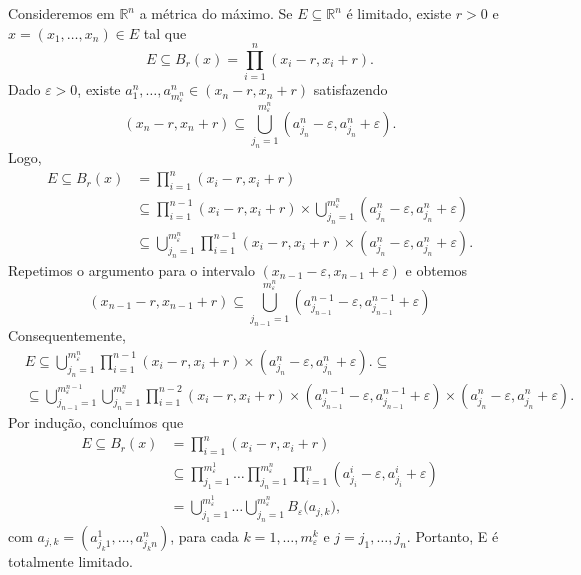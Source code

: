 \documentclass[MetricSpaces/metric_notes.tex]{subfiles}
\begin{document}
\begin{proof*}
	Consideremos em \(\mathbb{R}^{n}\) a métrica do máximo. Se \(E\subseteq{\mathbb{R}^{n}}\) é limitado, existe \(r > 0\) e \(x = (x_{1}, \dotsc, x_{n})\in E\) tal que
	\[
		E\subseteq{B_{r}(x)} = \prod\limits_{i=1}^{n}(x_{i}-r, x_{i}+r).
	\]
	Dado \(\varepsilon >0\), existe \(a_{1}^{n}, \dotsc, a_{m_{\varepsilon }^{n}}^{n}\in(x_{n}-r, x_{n}+r)\) satisfazendo
	\[
		(x_{n}-r,x_{n}+r) \subseteq{\bigcup_{j_{n}=1}^{m_{\varepsilon }^{n}}{(a_{j_{n}}^{n}-\varepsilon , a_{j_{n}}^{n}+\varepsilon )}}.
	\]
	Logo,
	\begin{align*}
		E \subseteq{B_{r}(x)} & =\prod\limits_{i=1}^{n}(x_{i}-r, x_{i}+r)                                                                                                                      \\
		                      & \subseteq{}\prod\limits_{i=1}^{n-1}(x_{i}-r, x_{i}+r)\times \bigcup_{j_{n}=1}^{m_{\varepsilon }^{n}}{(a_{j_{n}}^{n}-\varepsilon , a_{j_{n}}^{n}+\varepsilon )} \\
		                      & \subseteq{\bigcup_{j_{n}=1}^{m_{\varepsilon }^{n}}\prod\limits_{i=1}^{n-1}(x_{i}-r, x_{i}+r)\times (a_{j_{n}}^{n}-\varepsilon , a_{j_{n}}^{n}+\varepsilon ).}
	\end{align*}
	Repetimos o argumento para o intervalo \((x_{n-1}-\varepsilon , x_{n-1}+\varepsilon )\) e obtemos
	\[
		(x_{n-1}-r, x_{n-1}+r)\subseteq{\bigcup_{j_{n-1}=1}^{m_{\varepsilon }^{n}}{(a_{j_{n-1}}^{n-1}-\varepsilon, a_{j_{n-1}}^{n-1}+\varepsilon  )}}
	\]
	Consequentemente,
	\begin{align*}
		 & E\subseteq{\bigcup_{j_{n}=1}^{m_{\varepsilon }^{n}}\prod\limits_{i=1}^{n-1}(x_{i}-r, x_{i}+r)\times (a_{j_{n}}^{n}-\varepsilon , a_{j_{n}}^{n}+\varepsilon ).}\subseteq{}                                                                                                       \\
		 & \subseteq{\bigcup_{j_{n-1}=1}^{m_{\varepsilon }^{n-1}}\bigcup_{j_{n}=1}^{m_{\varepsilon }^{n}}\prod\limits_{i=1}^{n-2}(x_{i}-r, x_{i}+r)\times(a_{j_{n-1}}^{n-1}-\varepsilon , a_{j_{n-1}}^{n-1}+\varepsilon )\times (a_{j_{n}}^{n}-\varepsilon , a_{j_{n}}^{n}+\varepsilon ).}
	\end{align*}
	Por indução, concluímos que
	\begin{align*}
		E \subseteq{B_{r}(x)} & =\prod\limits_{i=1}^{n}(x_{i}-r, x_{i}+r)                                                                                                                                                  \\
		                      & \subseteq{}\prod\limits_{j_{1}=1}^{m_{\varepsilon }^{1}}\dotsc \prod\limits_{j_{n}=1}^{m_{\varepsilon }^{n}}\prod\limits_{i=1}^{n}(a_{j_{i}}^{i}-\varepsilon , a_{j_{i}}^{i}+\varepsilon ) \\
		                      & =\bigcup_{j_{1}=1}^{m_{\varepsilon }^{1}}{\dotsc}\bigcup_{j_{n}=1}^{m_{\varepsilon }^{n}}{B_{\varepsilon }(a_{j, k}}),
	\end{align*}
	com \(a_{j, k} = (a_{j_{k}1}^{1},\dotsc,a_{j_{k}n}^{n})\), para cada \(k=1, \dotsc, m_{\varepsilon }^{k}\) e \(j=j_{1},\dotsc,j_{n}\). Portanto, E é totalmente limitado. \qedsymbol
\end{proof*}
\end{document}
